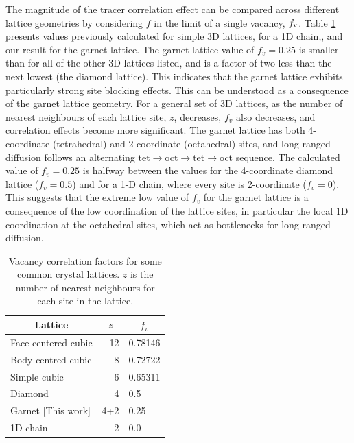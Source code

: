 \documentclass[aps,prb,twocolumn,superscriptaddress,reprint]{revtex4-1}
\begin{document}
The magnitude of the tracer correlation effect can be compared across different lattice geometries by considering $f$ in the limit of a single vacancy, $f_{\mathrm{v}}$. 
Table \ref{tab:vacancy_correlation_factors} presents values previously calculated for simple 3D lattices,\cite{CompaanAndHaven_TransFaradaySoc1956} for a 1D chain,\cite{Mehrer_DiffusionBook}, and our result for the garnet lattice. 
The garnet lattice value of $f_v=0.25$ is smaller than for all of the other 3D lattices listed, and is a factor of two less than the next lowest (the diamond lattice). This indicates that the garnet lattice exhibits particularly strong site blocking effects. 
This can be understood as a consequence of the garnet lattice geometry. 
For a general set of 3D lattices, as the number of nearest neighbours of each lattice site, $z$, decreases, $f_v$ also decreases, and correlation effects become more significant.
The garnet lattice has both 4-coordinate (tetrahedral) and 2-coordinate (octahedral) sites, and long ranged diffusion follows an alternating tet$\to$oct$\to$tet$\to$oct sequence. 
The calculated value of $f_v=0.25$ is halfway between the values for the 4-coordinate diamond lattice ($f_v=0.5$) and for a 1-D chain, where every site is 2-coordinate ($f_v=0$).\cite{Mehrer_DiffusionBook} 
This suggests that the extreme low value of $f_v$ for the garnet lattice is a consequence of the low coordination of the lattice sites, in particular the local 1D coordination at the octahedral sites, which act as bottlenecks for long-ranged diffusion. 

\begin{table}[htb]
   \begin{center}
     \begin{tabular}{lrl} \hline
        \multicolumn{1}{c}{Lattice} & \multicolumn{1}{c}{$z$} & \multicolumn{1}{c}{$f_v$} \\ \hline
        Face centered cubic\cite{CompaanAndHaven_TransFaradaySoc1956} & 12 & 0.78146 \\
        Body centred cubic\cite{CompaanAndHaven_TransFaradaySoc1956} & 8 & 0.72722 \\
        Simple cubic\cite{CompaanAndHaven_TransFaradaySoc1956} & 6 & 0.65311 \\
        Diamond\cite{CompaanAndHaven_TransFaradaySoc1956} & 4 & 0.5 \\
        Garnet [This work] & 4+2 & 0.25 \\ 
        1D chain\cite{Mehrer_DiffusionBook} & 2 & 0.0 \\ \hline
     \end{tabular}
   \caption{\label{tab:vacancy_correlation_factors}Vacancy correlation factors for some common crystal lattices. $z$ is the number of nearest neighbours for each site in the lattice.}
   \end{center}
 \end{table}
\end{document}
